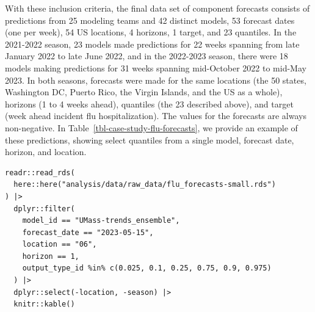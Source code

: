 \documentclass[
  article,
  shortnames,
  notitle]{jss}
\begin{document}
With these inclusion criteria, the final data set of component forecasts
consists of predictions from 25 modeling teams and 42 distinct models,
53 forecast dates (one per week), 54 US locations, 4 horizons, 1 target,
and 23 quantiles. In the 2021-2022 season, 23 models made predictions
for 22 weeks spanning from late January 2022 to late June 2022, and in
the 2022-2023 season, there were 18 models making predictions for 31
weeks spanning mid-October 2022 to mid-May 2023. In both seasons,
forecasts were made for the same locations (the 50 states, Washington
DC, Puerto Rico, the Virgin Islands, and the US as a whole), horizons (1
to 4 weeks ahead), quantiles (the 23 described above), and target (week
ahead incident flu hospitalization). The values for the forecasts are
always non-negative. In Table~\ref{tbl-case-study-flu-forecasts}, we
provide an example of these predictions, showing select quantiles from a
single model, forecast date, horizon, and location.

\begin{verbatim}
readr::read_rds(
  here::here("analysis/data/raw_data/flu_forecasts-small.rds")
) |>
  dplyr::filter(
    model_id == "UMass-trends_ensemble",
    forecast_date == "2023-05-15",
    location == "06",
    horizon == 1,
    output_type_id %in% c(0.025, 0.1, 0.25, 0.75, 0.9, 0.975)
  ) |>
  dplyr::select(-location, -season) |>
  knitr::kable()
\end{verbatim}
\end{document}

